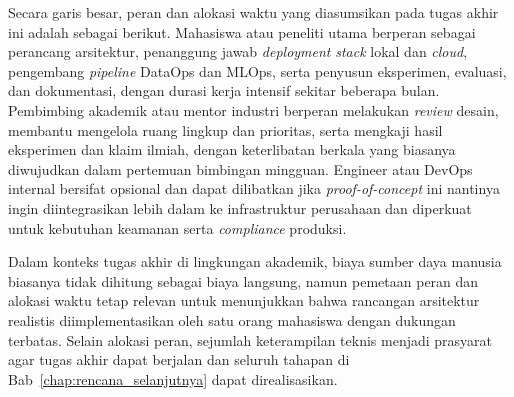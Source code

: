 Secara garis besar, peran dan alokasi waktu yang diasumsikan pada tugas akhir ini adalah sebagai berikut. Mahasiswa atau peneliti utama berperan sebagai perancang arsitektur, penanggung jawab \textit{deployment} \textit{stack} lokal dan \textit{cloud}, pengembang \textit{pipeline} DataOps dan MLOps, serta penyusun eksperimen, evaluasi, dan dokumentasi, dengan durasi kerja intensif sekitar beberapa bulan. Pembimbing akademik atau mentor industri berperan melakukan \textit{review} desain, membantu mengelola ruang lingkup dan prioritas, serta mengkaji hasil eksperimen dan klaim ilmiah, dengan keterlibatan berkala yang biasanya diwujudkan dalam pertemuan bimbingan mingguan. Engineer atau DevOps internal bersifat opsional dan dapat dilibatkan jika \textit{proof-of-concept} ini nantinya ingin diintegrasikan lebih dalam ke infrastruktur perusahaan dan diperkuat untuk kebutuhan keamanan serta \textit{compliance} produksi.

Dalam konteks tugas akhir di lingkungan akademik, biaya sumber daya manusia biasanya tidak dihitung sebagai biaya langsung, namun pemetaan peran dan alokasi waktu tetap relevan untuk menunjukkan bahwa rancangan arsitektur realistis diimplementasikan oleh satu orang mahasiswa dengan dukungan terbatas. Selain alokasi peran, sejumlah keterampilan teknis menjadi prasyarat agar tugas akhir dapat berjalan dan seluruh tahapan di Bab~\ref{chap:rencana_selanjutnya} dapat direalisasikan.

\vspace{0.5em}

